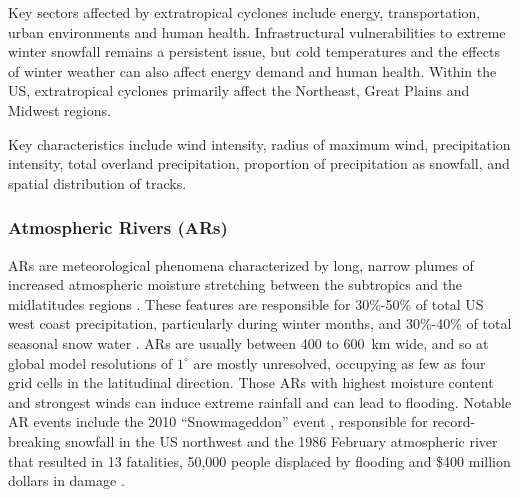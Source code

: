 \documentclass[11pt]{article}
\begin{document}
Key sectors affected by extratropical cyclones include energy, transportation, urban environments and human health.  Infrastructural vulnerabilities to extreme winter snowfall remains a persistent issue, but  cold temperatures and the effects of winter weather can also affect energy demand and human health.  Within the US, extratropical cyclones primarily affect the Northeast, Great Plains and Midwest regions.

Key characteristics include wind intensity, radius of maximum wind, precipitation intensity, total overland precipitation, proportion of precipitation as snowfall, and spatial distribution of tracks.

\subsubsection*{Atmospheric Rivers (ARs)}

ARs are meteorological phenomena characterized by long, narrow plumes of increased atmospheric moisture stretching between the subtropics and the midlatitudes regions \citep{ralph2011storms}.  These features are responsible for 30\%-50\% of total US west coast precipitation, particularly during winter months, and 30\%-40\% of total seasonal snow water \citep{dettinger2011atmospheric, warner2012wintertime}.  ARs are usually between 400 to 600\ km wide, and so at global model resolutions of $1^\circ$ are mostly unresolved, occupying as few as four grid cells in the latitudinal direction.  Those ARs with highest moisture content and strongest winds can induce extreme rainfall and can lead to flooding.  Notable AR events include the 2010 ``Snowmageddon'' event \citep{halverson2010mega}, responsible for record-breaking snowfall in the US northwest and the 1986 February atmospheric river that resulted in 13 fatalities, 50,000 people displaced by flooding and \$400 million dollars in damage \citep{leung2009atmospheric}.



\end{document}
